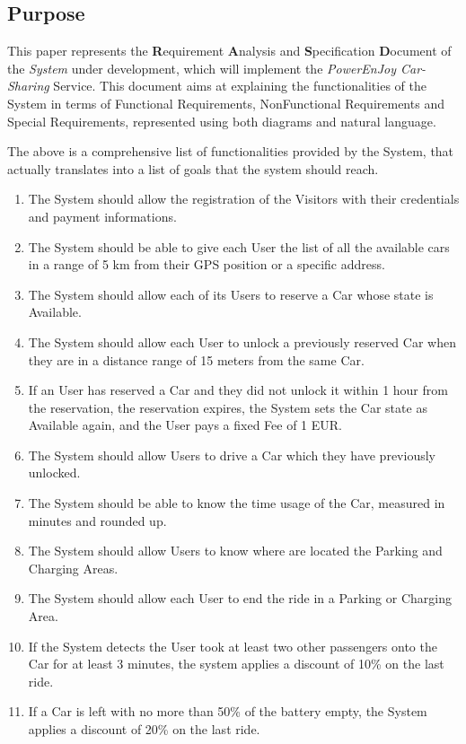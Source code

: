 \subsection{Purpose}
This paper represents the \textbf{R}equirement \textbf{A}nalysis and \textbf{S}pecification \textbf{D}ocument of the \textit{System} under development, which will implement the \emph{PowerEnJoy Car-Sharing} Service. This document aims at explaining the functionalities of the System in terms of Functional Requirements, NonFunctional Requirements and Special Requirements, represented using both diagrams and natural language.

The above is a comprehensive list of functionalities provided by the System, that actually translates into a list of goals that the system should reach.

\begin{enumerate}[label=\textbf{G\arabic*}]
	\item The System should allow the registration of the Visitors with their credentials and payment informations.
	\item The System should be able to give each User the list of all the available cars in a range of 5 km from their GPS position or a specific address.
	\item The System should allow each of its Users to reserve a Car whose state is Available.
	\item The System should allow each User to unlock a previously reserved Car when they are in a distance range of 15 meters from the same Car.
	\item If an User has reserved a Car and they did not unlock it within 1 hour from the reservation, the reservation expires, the System sets the Car state as Available again, and the User pays a fixed Fee of 1 EUR.  
	\item The System should allow Users to drive a Car which they have previously unlocked.
	\item The System should be able to know the time usage of the Car, measured in minutes and rounded up.
	\item The System should allow Users to know where are located the Parking and Charging Areas.
	\item The System should allow each User to end the ride in a Parking or Charging Area.
	\item If the System detects the User took at least two other passengers onto the Car for at least 3 minutes, the system applies a discount of 10\% on the last ride.
	\item If a Car is left with no more than 50\% of the battery empty, the System applies a discount of 20\% on the last ride. 

\end{enumerate}
